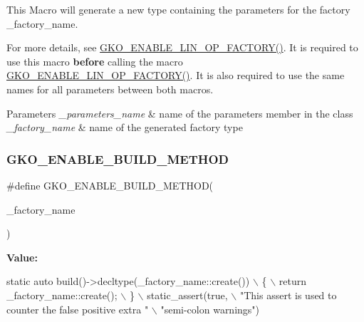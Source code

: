 This Macro will generate a new type containing the parameters for the factory {\ttfamily \+\_\+factory\+\_\+name}. 

For more details, see \hyperlink{group__LinOp_ga8e0af90ec2414b768266f77cedffc309}{G\+K\+O\+\_\+\+E\+N\+A\+B\+L\+E\+\_\+\+L\+I\+N\+\_\+\+O\+P\+\_\+\+F\+A\+C\+T\+O\+R\+Y()}. It is required to use this macro {\bfseries before} calling the macro \hyperlink{group__LinOp_ga8e0af90ec2414b768266f77cedffc309}{G\+K\+O\+\_\+\+E\+N\+A\+B\+L\+E\+\_\+\+L\+I\+N\+\_\+\+O\+P\+\_\+\+F\+A\+C\+T\+O\+R\+Y()}. It is also required to use the same names for all parameters between both macros.


\begin{DoxyParams}{Parameters}
{\em \+\_\+parameters\+\_\+name} & name of the parameters member in the class \\
\hline
{\em \+\_\+factory\+\_\+name} & name of the generated factory type \\
\hline
\end{DoxyParams}
\mbox{\label{group__LinOp_ga521f65604cc4cf427dcb2ecfa49b757c}} 
\subsubsection{\texorpdfstring{G\+K\+O\+\_\+\+E\+N\+A\+B\+L\+E\+\_\+\+B\+U\+I\+L\+D\+\_\+\+M\+E\+T\+H\+OD}{GKO\_ENABLE\_BUILD\_METHOD}}
{\footnotesize\ttfamily \#define G\+K\+O\+\_\+\+E\+N\+A\+B\+L\+E\+\_\+\+B\+U\+I\+L\+D\+\_\+\+M\+E\+T\+H\+OD(\begin{DoxyParamCaption}\item[{}]{\+\_\+factory\+\_\+name }\end{DoxyParamCaption})}

{\bfseries Value\+:}
\begin{DoxyCode}
\textcolor{keyword}{static} \textcolor{keyword}{auto} build()->decltype(\_factory\_name::create())                   \(\backslash\)
    \{                                                                        \(\backslash\)
        return \_factory\_name::create();                                      \(\backslash\)
    \}                                                                        \(\backslash\)
    static\_assert(\textcolor{keyword}{true},                                                      \(\backslash\)
                  \textcolor{stringliteral}{"This assert is used to counter the false positive extra "} \(\backslash\)
                  \textcolor{stringliteral}{"semi-colon warnings"})
\end{DoxyCode}


